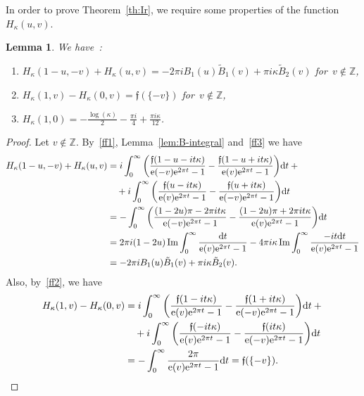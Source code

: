 \documentclass[11pt]{amsart}
\newcommand{\Z}{\mathbb{Z}}
\newcommand{\lf}{{\mathfrak f}}
\newtheorem{lemma}{Lemma}
\theoremstyle{definition}
\newcommand{\pr}[1]{\mathchoice{\left( #1\right)}{(#1)}{(#1)}{(#1)}}
\newcommand{\e}[1][]{\ifthenelse{\equal{#1}{}}{{\rm e}}{\operatorname{e}\pr{ #1}}}
\newcommand{\df}{\mathrm{d}}
\renewcommand\Im{\operatorname{Im}}
\newcommand{\1}{{\mathbf 1}}
\let\originalleft\left
\let\originalright\right
\renewcommand{\left}{\mathopen{}\mathclose\bgroup\originalleft}
\renewcommand{\right}{\aftergroup\egroup\originalright}
\numberwithin{equation}{section}
\begin{document}
In order to prove Theorem~\ref{th:Ir}, we require some properties of the function
$H_\kappa(u, v)$.
\begin{lemma}\label{lemmah}
  We have~:
  \begin{enumerate}
  \item\label{prop-B-sym} ${H_\kappa(1-u, -v)} + H_\kappa(u, v)= - 2{\pi i} B_1(u)\tilde B_1(v) + \pi i\kappa \tilde B_2(v)$ for~$v\notin\Z$,
  \item\label{prop-B-f} $H_\kappa(1, v) - H_\kappa(0, v) = \lf(\{-v\}) $ for~$v\notin\Z$,
  \item\label{prop-B-pole} $H_\kappa(1, 0) =   - \frac{\log(  \kappa) }{2 }-   \frac{\pi  i   }{4  } + \frac{ \pi i \kappa}{12} $.
  \end{enumerate}
\end{lemma}
\begin{proof}
  Let $v\notin\Z$. By~\eqref{ff1}, Lemma~\ref{lem:B-integral} and~\eqref{ff3} we have
  \begin{align*}
    {H_\kappa(1-u, -v)} + H_\kappa(u, v)&
    =  i
    \int_{0}^\infty   \bigg(\frac{\lf(1-u - it\kappa )}{\e[-v]\e^{2\pi t}-1}- \frac{\lf(1-u + it\kappa )}{\e[v]\e^{2\pi t}-1}\bigg)\df{t}+{}\\
    &\quad +i
    \int_{0}^\infty   \bigg(    \frac{\lf(u - it\kappa )}{\e[v]\e^{2\pi t}-1}-\frac{\lf(u + it\kappa )}{\e[-v]\e^{2\pi t}-1}\bigg)\df{t}\\
    &= -\int_{0}^\infty   \bigg(\frac{(1- 2u)\pi   -  2\pi i t\kappa}{\e[-v]\e^{2\pi t}-1}- \frac{
      (1- 2u)\pi   + 2\pi i t\kappa
    }{\e[v]\e^{2\pi t}-1}\bigg)\df t\\
    &=2\pi i(1- 2u) \Im \int_{0}^\infty    \frac{ \df t}{\e[v]\e^{2\pi t}-1}-4\pi i\kappa \Im \int_{0}^\infty   \frac{-i t\df t}{\e[v]\e^{2\pi t}-1}\\
    &= -2{\pi i} B_1(u)\tilde B_1(v) +\pi i\kappa \tilde B_2(v).
  \end{align*}
  Also, by~\eqref{ff2}, we have
  \begin{align*}
    H_\kappa(1, v)-  H_\kappa(0, v) &= i
    \int_{0}^\infty   \bigg( \frac{\lf(1 - it\kappa )}{\e[v]\e^{2\pi t}-1}-   \frac{\lf(1 + it\kappa )}{\e[-v]\e^{2\pi t}-1}\bigg)\df{t}+{}\\
    &\quad + i \int_{0}^\infty   \bigg( \frac{\lf(- it\kappa )}{\e[v]\e^{2\pi t}-1}-   \frac{\lf( it\kappa )}{\e[-v]\e^{2\pi t}-1}\bigg)\df{t}\\
    &=-\int_{0}^\infty    \frac{2\pi }{\e[v]\e^{2\pi t}-1}\df{t}=\lf(\{-v\}).

\end{align*}
\end{proof}
\end{document}
